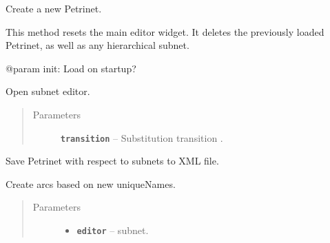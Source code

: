 \documentclass[a4paper,10pt,english]{sphinxmanual}
\begin{document}
\begin{fulllineitems}
\begin{fulllineitems}
\label{gui_link:gui.MainWindow.MainWindow.newNet}
Create a new Petrinet.

This method resets the main editor widget. It deletes 
the previously loaded Petrinet, as well as any hierarchical subnet.

@param init: Load on startup?

\end{fulllineitems}


\begin{fulllineitems}
\label{gui_link:gui.MainWindow.MainWindow.openSubnet}
Open subnet editor.
\begin{quote}\begin{description}
\item[{Parameters}] \leavevmode
\textbf{\texttt{transition}} -- Substitution transition .

\end{description}\end{quote}

\end{fulllineitems}


\begin{fulllineitems}
\label{gui_link:gui.MainWindow.MainWindow.saveNet}
Save Petrinet with respect to subnets to XML file.

\end{fulllineitems}


\begin{fulllineitems}
\label{gui_link:gui.MainWindow.MainWindow.setArc}
Create arcs based on new uniqueNames.
\begin{quote}\begin{description}
\item[{Parameters}] \leavevmode\begin{itemize}
\item {} 
\textbf{\texttt{editor}} --  subnet.


\end{itemize}
\end{description}
\end{quote}
\end{fulllineitems}
\end{fulllineitems}
\end{document}
